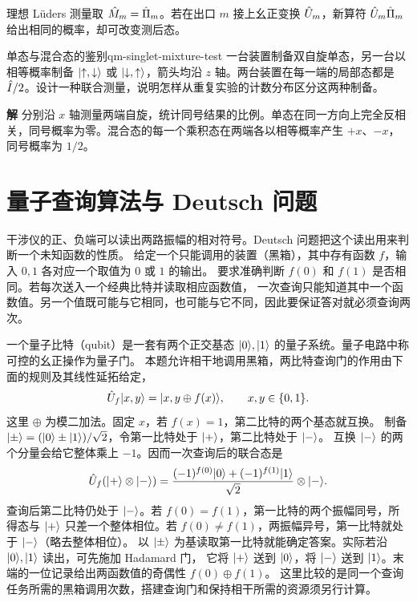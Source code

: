 理想 Lüders 测量取 $\hat{M}_m = \hat{\Pi}_m$。若在出口 $m$ 接上幺正变换 $\hat{U}_m$，新算符 $\hat{U}_m\hat{\Pi}_m$ 给出相同的概率，却可改变测后态。

\begin{example}{单态与混合态的鉴别}{qm-singlet-mixture-test}
    一台装置制备双自旋单态，另一台以相等概率制备 $\lvert\mathord{\uparrow},\mathord{\downarrow}\rangle$ 或 $\lvert\mathord{\downarrow},\mathord{\uparrow}\rangle$，箭头均沿 $z$ 轴。两台装置在每一端的局部态都是 $\hat{I}/2$。设计一种联合测量，说明怎样从重复实验的计数分布区分这两种制备。
    \par\smallskip\textbf{解}\quad
    分别沿 $x$ 轴测量两端自旋，统计同号结果的比例。单态在同一方向上完全反相关，同号概率为零。混合态的每一个乘积态在两端各以相等概率产生 $+x$、$-x$，同号概率为 $1/2$。
\end{example}
\section{量子查询算法与 Deutsch 问题}
\label{sec:qm-deutsch-query}
干涉仪的正、负端可以读出两路振幅的相对符号。Deutsch 问题把这个读出用来判断一个未知函数的性质。
给定一个只能调用的装置（黑箱），其中存有函数 $f$，输入 $0,1$ 各对应一个取值为 $0$ 或 $1$ 的输出。
要求准确判断 $f(0)$ 和 $f(1)$ 是否相同。若每次送入一个经典比特并读取相应函数值，
一次查询只能知道其中一个函数值。另一个值既可能与它相同，也可能与它不同，因此要保证答对就必须查询两次。

一个量子比特（qubit）是一套有两个正交基态 $\lvert0\rangle,\lvert1\rangle$ 的量子系统。量子电路中称可控的幺正操作为量子门。
本题允许相干地调用黑箱，两比特查询门的作用由下面的规则及其线性延拓给定\cite{cleve-algorithms}，
\begin{equation}\label{eq:qm-deutsch-oracle}
    \hat{U}_f\lvert x,y\rangle = \lvert x,y\mathbin{\oplus}f(x)\rangle,\qquad x,y\in\{0,1\}.
\end{equation}
这里 $\oplus$ 为模二加法。固定 $x$，若 $f(x) = 1$，第二比特的两个基态就互换。
制备 $\lvert\pm\rangle = (\lvert0\rangle \pm \lvert1\rangle)/\sqrt2$，令第一比特处于 $\lvert+\rangle$，第二比特处于 $\lvert-\rangle$。
互换 $\lvert-\rangle$ 的两个分量会给它整体乘上 $-1$。因而一次查询后的联合态是
\[
    \hat{U}_f(\lvert+\rangle\otimes\lvert-\rangle)
       = \frac{(-1)^{f(0)}\lvert0\rangle + (-1)^{f(1)}\lvert1\rangle}{\sqrt2}\otimes\lvert-\rangle .
\]
查询后第二比特仍处于 $\lvert-\rangle$。若 $f(0) = f(1)$，第一比特的两个振幅同号，所得态与 $\lvert+\rangle$ 只差一个整体相位。若 $f(0) \ne f(1)$，两振幅异号，第一比特就处于 $\lvert-\rangle$（略去整体相位）。
以 $\lvert\pm\rangle$ 为基读取第一比特就能确定答案。实际若沿 $\lvert0\rangle,\lvert1\rangle$ 读出，可先施加 Hadamard 门，
它将 $\lvert+\rangle$ 送到 $\lvert0\rangle$，将 $\lvert-\rangle$ 送到 $\lvert1\rangle$。末端的一位记录给出两函数值的奇偶性 $f(0)\oplus f(1)$。
这里比较的是同一个查询任务所需的黑箱调用次数，搭建查询门和保持相干所需的资源须另行计算。

